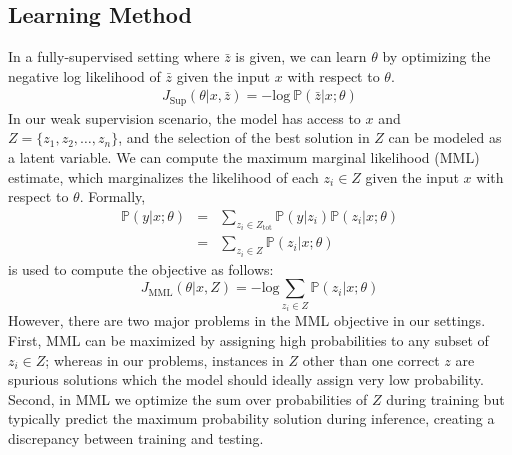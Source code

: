 \documentclass[11pt,a4paper]{article}
\begin{document}
\subsection{Learning Method}
In a fully-supervised setting where $\bar{z}$ is given, we can learn $\theta$ by optimizing the negative log likelihood of $\bar{z}$ given the input $x$ with respect to $\theta{}$.
\begin{align*}
    J_{\text{Sup}}(\theta{}|x, \bar{z}) = - \mathrm{log} ~\mathbb{P}(\bar{z} | x; \theta{})
\end{align*}
In our weak supervision scenario, the model has access to $x$ and $Z = \{ z_1, z_2, \dots, z_n \}$, and the selection of the best solution in $Z$ can be modeled as a latent variable. We can compute the maximum marginal likelihood (MML) estimate, which marginalizes the likelihood of each $z_i \in Z$ given the input $x$ with respect to $\theta{}$. Formally, \begin{eqnarray*}
    \mathbb{P}(y|x; \theta{}) &=& \sum_{z_i \in Z_\text{tot}} \mathbb{P}(y|z_i) \mathbb{P}(z_i|x; \theta{}) \\
    &=& \sum_{z_i \in Z} \mathbb{P}(z_i|x; \theta{})
\end{eqnarray*} is used to compute the objective as follows:
\begin{equation*}
    J_{\text{MML}}(\theta{}|x, Z) = - \mathrm{log} \sum_{z_i \in Z}  \mathbb{P}(z_i | x; \theta{})
\end{equation*}
However, there are two major problems in the MML objective in our settings. 
First, MML can be maximized by assigning high probabilities to any subset of $z_i \in Z$; whereas in our problems, instances in $Z$ other than one correct $z$ are spurious solutions which the model should ideally assign very low probability.
Second, in MML we optimize the sum over probabilities of $Z$ during training but typically predict the maximum probability solution during inference, creating a discrepancy between training and testing. 
\end{document}
